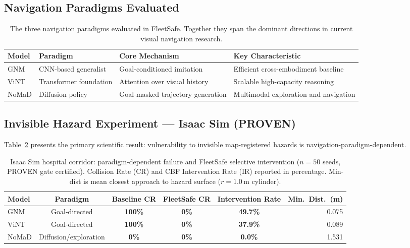 \documentclass[12pt,a4paper]{article}
\newcommand{\proven}[1]{\textcolor{ProvenGreen}{\textbf{#1}}}
\newcommand{\danger}[1]{\textcolor{DangerRed}{\textbf{#1}}}
\newcommand{\cbf}[1]{\textcolor{CbfAmber}{\textbf{#1}}}
\begin{document}
\subsection{Navigation Paradigms Evaluated}

\begin{table}[t]
\centering
\caption{The three navigation paradigms evaluated in FleetSafe. Together they
         span the dominant directions in current visual navigation research.}
\label{tab:paradigms}
\begin{tabular}{@{}llll@{}}
\toprule
Model & Paradigm & Core Mechanism & Key Characteristic \\
\midrule
GNM   & CNN-based generalist      & Goal-conditioned imitation   &
        Efficient cross-embodiment baseline \\
ViNT  & Transformer foundation    & Attention over visual history &
        Scalable high-capacity reasoning \\
NoMaD & Diffusion policy          & Goal-masked trajectory generation &
        Multimodal exploration and navigation \\
\bottomrule
\end{tabular}
\end{table}

\FloatBarrier
\subsection{Invisible Hazard Experiment — Isaac Sim (PROVEN)}

Table~\ref{tab:isaac} presents the primary scientific result: vulnerability to
invisible map-registered hazards is navigation-paradigm-dependent.

\begin{table}[t]
\centering
\caption{Isaac Sim hospital corridor: paradigm-dependent failure and FleetSafe
         selective intervention ($n = 50$ seeds, PROVEN gate certified).
         Collision Rate (CR) and CBF Intervention Rate (IR) reported in
         percentage. Min-dist is mean closest approach to hazard surface
         ($r = 1.0$\,m cylinder).}
\label{tab:isaac}
\setlength{\tabcolsep}{6pt}
\begin{tabular}{@{}lccccr@{}}
\toprule
Model & Paradigm & Baseline CR & FleetSafe CR & Intervention Rate &
Min.\ Dist.\ (m) \\
\midrule
GNM   & Goal-directed        & \danger{100\%} & \proven{0\%} & \cbf{49.7\%} &
        0.075 \\
ViNT  & Goal-directed        & \danger{100\%} & \proven{0\%} & \cbf{37.9\%} &
        0.089 \\
NoMaD & Diffusion/exploration & \proven{0\%}  & \proven{0\%} & \textbf{0.0\%} &
        1.531 \\
\bottomrule
\end{tabular}
\end{table}
\end{document}
